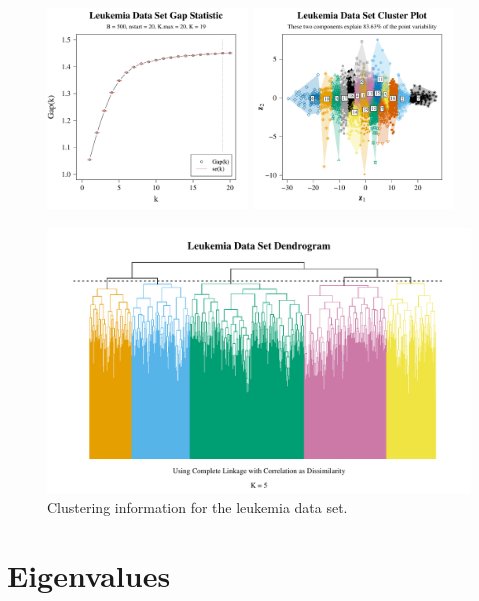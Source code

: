 \documentclass[10pt]{article}
\begin{document}
\begin{figure}[ht]
\centering
\includegraphics[width = 0.475\textwidth]{leuk_gap_stat.pdf}
\includegraphics[width = 0.475\textwidth]{leuk_clus_plot.pdf}

\includegraphics[width = \textwidth]{leuk_den.pdf}
\caption{Clustering information for the leukemia data set.}
\label{leukclus}
\end{figure}



\newpage
\section{Eigenvalues}
\end{document}
